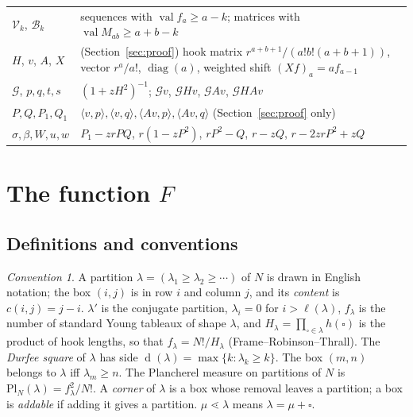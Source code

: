 \documentclass[11pt]{article}
\theoremstyle{definition}
\theoremstyle{remark}
\newtheorem{convention}[theorem]{Convention}
\newcommand{\Pl}{\mathrm{Pl}}
\DeclareMathOperator{\Durfee}{d}
\begin{document}
\begin{center}
\begin{tabular}{lp{3.9in}}
$\mathcal V_k$, $\mathcal B_k$ & sequences with $\operatorname{val}f_a\ge a-k$; matrices with $\operatorname{val}M_{ab}\ge a+b-k$\\
$H$, $v$, $A$, $X$ & (Section~\ref{sec:proof}) hook matrix $r^{a+b+1}/(a!b!(a+b+1))$, vector $r^a/a!$, $\operatorname{diag}(a)$, weighted shift $(Xf)_a=af_{a-1}$\\
$\mathcal G$, $p,q,t,s$ & $(1+zH^2)^{-1}$; $\mathcal Gv$, $\mathcal GHv$, $\mathcal GAv$, $\mathcal GHAv$\\
$P,Q,P_1,Q_1$ & $\langle v,p\rangle,\langle v,q\rangle,\langle Av,p\rangle,\langle Av,q\rangle$ (Section~\ref{sec:proof} only)\\
$\sigma,\beta,W,u,w$ & $P_1-zrPQ$, $r(1-zP^2)$, $rP^2-Q$, $r-zQ$, $r-2zrP^2+zQ$\\
\bottomrule
\end{tabular}
\end{center}

\section{The function $F$}\label{sec:setup}

\subsection{Definitions and conventions}

\begin{convention}
A partition $\lambda=(\lambda_1\ge\lambda_2\ge\cdots)$ of $N$ is drawn in English notation; the box $(i,j)$ is in row $i$ and column $j$, and its \emph{content} is $c(i,j)=j-i$. $\lambda'$ is the conjugate partition, $\lambda_i=0$ for $i>\ell(\lambda)$, $f_\lambda$ is the number of standard Young tableaux of shape $\lambda$, and $H_\lambda=\prod_{\square\in\lambda}h(\square)$ is the product of hook lengths, so that $f_\lambda=N!/H_\lambda$ (Frame--Robinson--Thrall). The \emph{Durfee square} of $\lambda$ has side $\Durfee(\lambda)=\max\{k:\lambda_k\ge k\}$. The box $(m,n)$ belongs to $\lambda$ iff $\lambda_m\ge n$. The Plancherel measure on partitions of $N$ is $\Pl_N(\lambda)=f_\lambda^2/N!$. A \emph{corner} of $\lambda$ is a box whose removal leaves a partition; a box is \emph{addable} if adding it gives a partition. $\mu\lessdot\lambda$ means $\lambda=\mu+\square$.
\end{convention}
\end{document}
